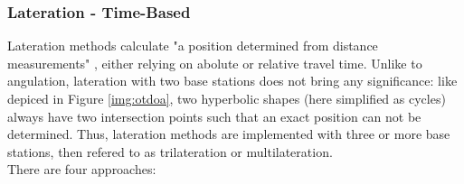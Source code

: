 \subsubsection{Lateration - Time-Based}
Lateration methods calculate "a position determined from distance measurements" \cite{recentAdvances}, either relying on abolute or relative travel time. Unlike to angulation, lateration with two base stations does not bring any significance: like depiced in Figure \ref{img:otdoa}, two hyperbolic shapes (here simplified as cycles) always have two intersection points such that an exact position can not be determined. Thus, lateration methods are implemented with three or more base stations, then refered to as trilateration or multilateration. \\

There are four approaches:

